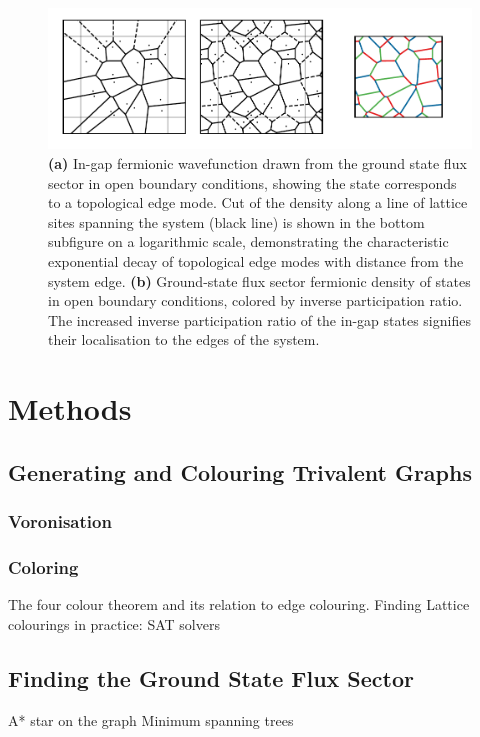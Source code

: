 \begin{figure}
    \centering
    \includegraphics[width=\columnwidth]{figure_code/amk_chapter/lattice_construction/lattice_construction}
    \caption{\textbf{(a)} In-gap fermionic wavefunction drawn from the ground state flux sector in open boundary conditions, showing the state corresponds to a topological edge mode. Cut of the density along a line of lattice sites spanning the system (black line) is shown in the bottom subfigure on a logarithmic scale, demonstrating the characteristic exponential decay of topological edge modes with distance from the system edge. \textbf{(b)} Ground-state flux sector fermionic density of states in open boundary conditions, colored by inverse participation ratio. The increased inverse participation ratio of the in-gap states signifies their localisation to the edges of the system.}
    \label{fig:lattice_generation}
\end{figure}


\section{Methods}
        \subsection{Generating and Colouring Trivalent Graphs}
		\subsubsection{Voronisation}
		\subsubsection{Coloring}
		    The four colour theorem and its relation to edge colouring.
		    Finding Lattice colourings in practice: SAT solvers 
		
		\subsection{Finding the Ground State Flux Sector}
            A* star on the graph
		    Minimum spanning trees
    
